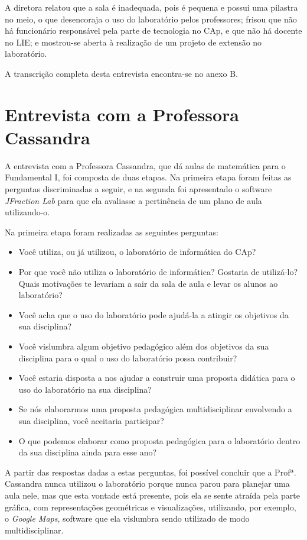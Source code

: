 A diretora relatou que a sala é inadequada, pois é pequena e possui uma pilastra no meio, o que desencoraja o uso do laboratório pelos professores; frisou que não há funcionário responsável pela parte de tecnologia no CAp, e que não há docente no LIE; e mostrou-se aberta à realização de um projeto de extensão no laboratório.

A transcrição completa desta entrevista encontra-se no anexo B.

\section{Entrevista com a Professora Cassandra}\label{chp:LABEL_CHP_ENT_SEC_CASS}

A entrevista com a Professora Cassandra, que dá aulas de matemática para o Fundamental I, foi composta de duas etapas. Na primeira etapa foram feitas as perguntas discriminadas a seguir, e na segunda foi apresentado o software \textit{JFraction Lab} para que ela avaliasse a pertinência de um plano de aula utilizando-o. 

Na primeira etapa foram realizadas as seguintes perguntas:

\begin{itemize}
\item{Você utiliza, ou já utilizou, o laboratório de informática do CAp?}
\item{Por que você não utiliza o laboratório de informática? Gostaria de utilizá-lo? Quais motivações te levariam a sair da sala de aula e levar os alunos ao laboratório?}
\item{Você acha que o uso do laboratório pode ajudá-la a atingir os objetivos da sua disciplina?}
\item{Você vislumbra algum objetivo pedagógico além dos objetivos da sua disciplina para o qual o uso do laboratório possa contribuir?}
\item{Você estaria disposta a nos ajudar a construir uma proposta didática para o uso do laboratório na sua disciplina?}
\item{Se nós elaborarmos uma proposta pedagógica multidisciplinar envolvendo a sua disciplina, você aceitaria participar?}
\item{O que podemos elaborar como proposta pedagógica para o laboratório dentro da sua disciplina ainda para esse ano?}
\end{itemize}

A partir das respostas dadas a estas perguntas, foi possível concluir que a Profª. Cassandra nunca utilizou o laboratório porque nunca parou para planejar uma aula nele, mas que esta vontade está presente, pois ela se sente atraída pela parte gráfica, com representações geométricas e visualizações, utilizando, por exemplo, o \textit{Google Maps}, software que ela vislumbra sendo utilizado de modo multidisciplinar.

